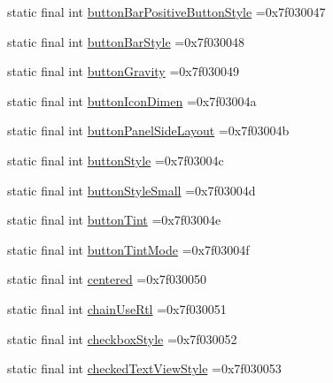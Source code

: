 \begin{DoxyCompactItemize}
static final int \mbox{\hyperlink{classcom_1_1example_1_1trainawearapplication_1_1_r_1_1attr_ad5b6084056b62e9c4ea88beeddea067a}{button\+Bar\+Positive\+Button\+Style}} =0x7f030047
\item 
static final int \mbox{\hyperlink{classcom_1_1example_1_1trainawearapplication_1_1_r_1_1attr_a0893ff687340524469bf81e524cd32ed}{button\+Bar\+Style}} =0x7f030048
\item 
static final int \mbox{\hyperlink{classcom_1_1example_1_1trainawearapplication_1_1_r_1_1attr_a62b0b6c31844afd31cf388c1a2ff14b6}{button\+Gravity}} =0x7f030049
\item 
static final int \mbox{\hyperlink{classcom_1_1example_1_1trainawearapplication_1_1_r_1_1attr_a8f82ba1103929aa752272141479894cb}{button\+Icon\+Dimen}} =0x7f03004a
\item 
static final int \mbox{\hyperlink{classcom_1_1example_1_1trainawearapplication_1_1_r_1_1attr_a0a97b6623038284d1ec7d2d4d3bd72af}{button\+Panel\+Side\+Layout}} =0x7f03004b
\item 
static final int \mbox{\hyperlink{classcom_1_1example_1_1trainawearapplication_1_1_r_1_1attr_a311b351d06a3707f3a7d0008af07384f}{button\+Style}} =0x7f03004c
\item 
static final int \mbox{\hyperlink{classcom_1_1example_1_1trainawearapplication_1_1_r_1_1attr_a33590d1b8ee18fee0275e01de0f8e144}{button\+Style\+Small}} =0x7f03004d
\item 
static final int \mbox{\hyperlink{classcom_1_1example_1_1trainawearapplication_1_1_r_1_1attr_a93dbde8fcdac146bfccfea120ff2f860}{button\+Tint}} =0x7f03004e
\item 
static final int \mbox{\hyperlink{classcom_1_1example_1_1trainawearapplication_1_1_r_1_1attr_a73b929dd4b29a09704fd1b2ebd770ac7}{button\+Tint\+Mode}} =0x7f03004f
\item 
static final int \mbox{\hyperlink{classcom_1_1example_1_1trainawearapplication_1_1_r_1_1attr_ac7e490eabab6041e16bb21b453a553af}{centered}} =0x7f030050
\item 
static final int \mbox{\hyperlink{classcom_1_1example_1_1trainawearapplication_1_1_r_1_1attr_a3e58c2d2afa88d0fd6d622810055c5d4}{chain\+Use\+Rtl}} =0x7f030051
\item 
static final int \mbox{\hyperlink{classcom_1_1example_1_1trainawearapplication_1_1_r_1_1attr_a0ac1c8854a7b3c2e235323928f6666c5}{checkbox\+Style}} =0x7f030052
\item 
static final int \mbox{\hyperlink{classcom_1_1example_1_1trainawearapplication_1_1_r_1_1attr_a1942f5fa7c473f30bb72a4841d881629}{checked\+Text\+View\+Style}} =0x7f030053

\end{DoxyCompactItemize}
